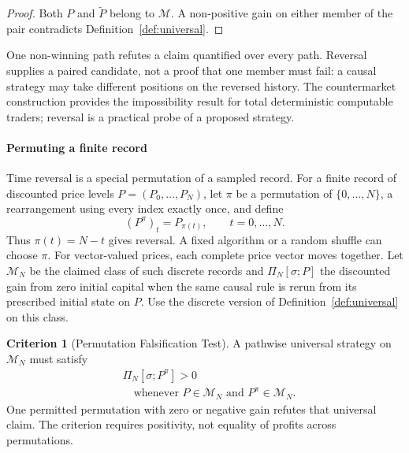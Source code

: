 \documentclass[aps,pra,reprint,superscriptaddress,amsmath,amssymb,floatfix]{revtex4-2}
\theoremstyle{plain}
\theoremstyle{definition}
\newtheorem{criterion}{Criterion}
\theoremstyle{remark}
\begin{document}
\begin{proof}
Both \(P\) and \(\widetilde P\) belong to \(\mathcal{M}\). A non-positive gain
on either member of the pair contradicts Definition~\ref{def:universal}.
\end{proof}

One non-winning path refutes a claim quantified over every path. Reversal
supplies a paired candidate, not a proof that one member must fail: a causal
strategy may take different positions on the reversed history.
The countermarket construction provides the impossibility result for total
deterministic computable traders; reversal is a practical probe of a proposed
strategy.

\paragraph{Permuting a finite record}

Time reversal is a special permutation of a sampled record. For a finite
record of discounted price levels \(P=(P_0,\ldots,P_N)\), let \(\pi\) be
a permutation of \(\{0,\ldots,N\}\), a rearrangement using every index exactly
once, and define
\begin{equation}
  (P^\pi)_t=P_{\pi(t)},\qquad t=0,\ldots,N.
  \label{eq:price-permutation}
\end{equation}
Thus \(\pi(t)=N-t\) gives reversal. A fixed algorithm or a random shuffle
can choose \(\pi\). For vector-valued prices, each complete price vector
moves together. Let \(\mathcal M_N\) be the claimed class of such discrete
records and \(\Pi_N[\sigma;P]\) the discounted gain from zero initial capital
when the same causal rule is rerun from its prescribed initial state on \(P\).
Use the discrete version of Definition~\ref{def:universal} on this class.

\begin{criterion}[Permutation Falsification Test]
  \label{crit:permutation}
  A pathwise universal strategy on \(\mathcal M_N\) must satisfy
  \begin{equation}
    \begin{aligned}
      &\Pi_N[\sigma;P^\pi]>0\\
      &\quad\text{whenever }P\in\mathcal M_N\text{ and }P^\pi\in\mathcal M_N.
    \end{aligned}
    \label{eq:permutationtest}
  \end{equation}
  One permitted permutation with zero or negative gain refutes that universal
  claim. The criterion requires positivity, not equality of profits across
  permutations.
\end{criterion}
\end{document}
